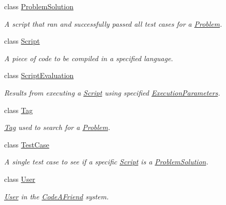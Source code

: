 \begin{DoxyCompactItemize}
class \mbox{\hyperlink{class_code_a_friend_1_1_data_model_1_1_problem_solution}{Problem\+Solution}}
\begin{DoxyCompactList}\small\item\em A script that ran and successfully passed all test cases for a \mbox{\hyperlink{class_code_a_friend_1_1_data_model_1_1_problem}{Problem}}.\end{DoxyCompactList}\item 
class \mbox{\hyperlink{class_code_a_friend_1_1_data_model_1_1_script}{Script}}
\begin{DoxyCompactList}\small\item\em A piece of code to be compiled in a specified language. \end{DoxyCompactList}\item 
class \mbox{\hyperlink{class_code_a_friend_1_1_data_model_1_1_script_evaluation}{Script\+Evaluation}}
\begin{DoxyCompactList}\small\item\em Results from executing a \mbox{\hyperlink{class_code_a_friend_1_1_data_model_1_1_script}{Script}} using specified \mbox{\hyperlink{class_code_a_friend_1_1_data_model_1_1_execution_parameters}{Execution\+Parameters}}. \end{DoxyCompactList}\item 
class \mbox{\hyperlink{class_code_a_friend_1_1_data_model_1_1_tag}{Tag}}
\begin{DoxyCompactList}\small\item\em \mbox{\hyperlink{class_code_a_friend_1_1_data_model_1_1_tag}{Tag}} used to search for a \mbox{\hyperlink{class_code_a_friend_1_1_data_model_1_1_problem}{Problem}}. \end{DoxyCompactList}\item 
class \mbox{\hyperlink{class_code_a_friend_1_1_data_model_1_1_test_case}{Test\+Case}}
\begin{DoxyCompactList}\small\item\em A single test case to see if a specific \mbox{\hyperlink{class_code_a_friend_1_1_data_model_1_1_script}{Script}} is a \mbox{\hyperlink{class_code_a_friend_1_1_data_model_1_1_problem_solution}{Problem\+Solution}}. \end{DoxyCompactList}\item 
class \mbox{\hyperlink{class_code_a_friend_1_1_data_model_1_1_user}{User}}
\begin{DoxyCompactList}\small\item\em \mbox{\hyperlink{class_code_a_friend_1_1_data_model_1_1_user}{User}} in the \mbox{\hyperlink{namespace_code_a_friend}{Code\+A\+Friend}} system.\end{DoxyCompactList}\item 

\end{DoxyCompactItemize}
